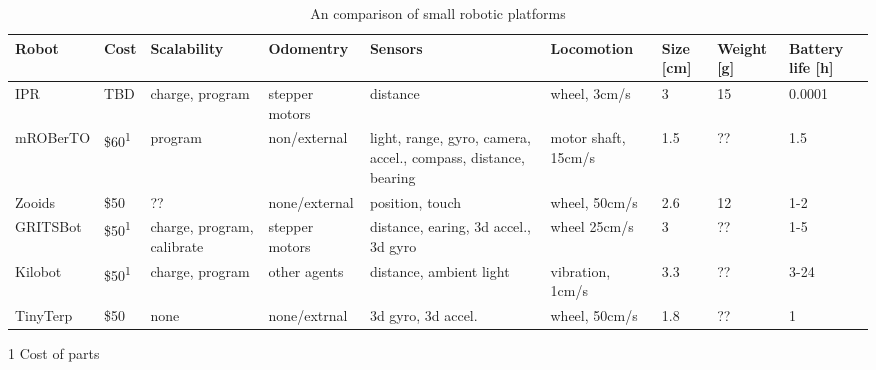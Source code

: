 \documentclass[letterpaper, 10 pt, conference]{ieeeconf}  %
\begin{document}





\begin{table*}[t]
	\centering
	\begin{threeparttable}
		\caption{An comparison of small robotic platforms}
		\label{tab:1}
 		\begin{tabularx}{500pt}{l l X l X l l l l} 
			\hline
 			Robot & Cost & Scalability & Odomentry & Sensors & Locomotion & Size [cm] & Weight [g] & Battery life [h] \\ 
 			\hline
 			IPR & TBD & charge, program & stepper motors & distance & wheel, 3cm/s & 3 & 15 & 0.0001\\
 			mROBerTO \cite{kim_iros_2016} & \$60\textsuperscript{1} & program & non/external & light, range, gyro, camera, accel., compass, distance, bearing & motor shaft, 15cm/s & 1.5 & ?? & 1.5\\
 			Zooids \cite{legoc_uist_2016} & \$50 & ?? & none/external & position, touch & wheel, 50cm/s & 2.6 & 12 & 1-2 \\ 
 			GRITSBot \cite{pickem_icra_2015} & \$50\textsuperscript{1} & charge, program, calibrate & stepper motors & distance, earing, 3d accel., 3d gyro & wheel 25cm/s & 3 & ?? & 1-5 \\
 			Kilobot \cite{rubenstein_icra_2012} & \$50\textsuperscript{1} & charge, program & other agents & distance, ambient light & vibration, 1cm/s & 3.3 & ?? & 3-24\\
 			TinyTerp \cite{sabelhaus_icra_2013} & \$50 & none & none/extrnal & 3d gyro, 3d accel. & wheel, 50cm/s & 1.8 & ?? & 1\\
			\hline
		\end{tabularx}
		\begin{tablenotes}
			\item [1] Cost of parts
		\end{tablenotes}
	\end{threeparttable}
\end{table*}
\end{document}
